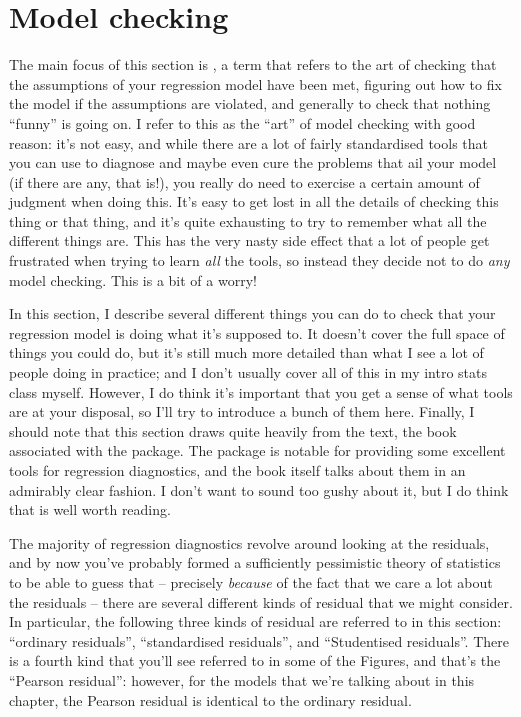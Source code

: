 \section{Model checking~\label{sec:regressiondiagnostics}}

The main focus of this section is , a term that refers to the art of checking that the assumptions of your regression model have been met, figuring out how to fix the model if the assumptions are violated, and generally to check that nothing ``funny'' is going on. I refer to this as the ``art'' of model checking with good reason: it's not easy, and while there are a lot of fairly standardised tools that you can use to diagnose and maybe even cure the problems that ail your model (if there are any, that is!), you really do need to exercise a certain amount of judgment when doing this. It's easy to get lost in all the details of checking this thing or that thing, and it's quite exhausting to try to remember what all the different things are. This has the very nasty side effect that a lot of people get frustrated when trying to learn {\it all} the tools, so instead they decide not to do {\it any} model checking. This is a bit of a worry! 

In this section, I describe several different things you can do to check that your regression model is doing what it's supposed to. It doesn't cover the full space of things you could do, but it's still much more detailed than what I see a lot of people doing in practice; and I don't usually cover all of this in my intro stats class myself. However, I do think it's important that you get a sense of what tools are at your disposal, so I'll try to introduce a bunch of them here. Finally, I should note that this section draws quite heavily from the  text, the book associated with the  package. The  package is notable for providing some excellent tools for regression diagnostics, and the book itself talks about them in an admirably clear fashion. I don't want to sound too gushy about it, but I do think that  is well worth reading.



The majority of regression diagnostics revolve around looking at the residuals, and by now you've probably formed a sufficiently pessimistic theory of statistics to be able to guess that -- precisely {\it because} of the fact that we care a lot about the residuals -- there are several different kinds of  residual that we might consider. In particular, the following three kinds of residual are referred to in this section: ``ordinary residuals'', ``standardised residuals'', and ``Studentised residuals''. There is a fourth kind that you'll see referred to in some of the Figures, and that's the ``Pearson residual'': however, for the models that we're talking about in this chapter, the Pearson residual is identical to the ordinary residual. 

